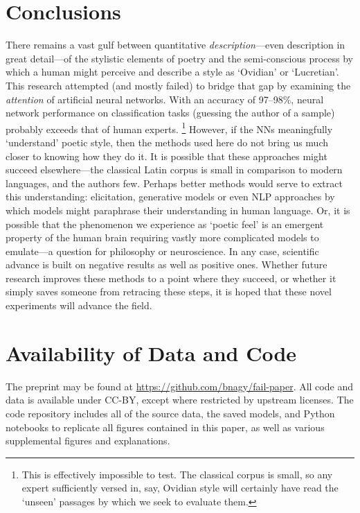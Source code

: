 \documentclass[
    twocolumn,
    hf,
]{ceurart}
\begin{document}
\FloatBarrier

\section{Conclusions}

There remains a vast gulf between quantitative \emph{description}---even
description in great detail---of the stylistic elements of poetry and the
semi-conscious process by which a human might perceive and describe a style as
`Ovidian' or `Lucretian'. This research attempted (and mostly failed) to bridge
that gap by examining the \emph{attention} of artificial neural networks. With
an accuracy of 97--98\%, neural network performance on classification tasks
(guessing the author of a sample) probably exceeds that of human experts.%
%
\footnote{
    This is effectively impossible to test. The classical corpus is small, so
    any expert sufficiently versed in, say, Ovidian style will certainly have read
    the `unseen' passages by which we seek to evaluate them.}
%
However, if the NNs meaningfully `understand' poetic style, then the methods
used here do not bring us much closer to knowing how they do it. It is possible
that these approaches might succeed elsewhere---the classical Latin corpus is
small in comparison to modern languages, and the authors few. Perhaps better
methods would serve to extract this understanding: elicitation, generative
models or even NLP approaches by which models might paraphrase their
understanding in human language. Or, it is possible that the phenomenon we
experience as `poetic feel' is an emergent property of the human brain requiring
vastly more complicated models to emulate---a question for philosophy or
neuroscience. In any case, scientific advance is built on negative results as
well as positive ones. Whether future research improves these methods to a point
where they succeed, or whether it simply saves someone from retracing these
steps, it is hoped that these novel experiments will advance the field.

\section{Availability of Data and Code}\label{sec:data}

The preprint may be found at \url{https://github.com/bnagy/fail-paper}. All code
and data is available under CC-BY, except where restricted by upstream licenses.
The code repository includes all of the source data, the saved models, and
Python notebooks to replicate all figures contained in this paper, as well as
various supplemental figures and explanations.
\end{document}
